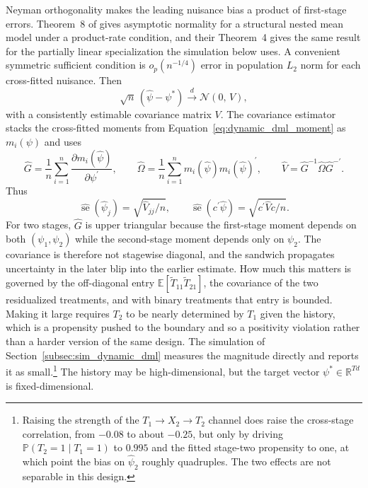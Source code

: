 Neyman orthogonality makes the leading nuisance bias a product of first-stage errors. Theorem~8 of \citet{lewisSyrgkanis2021dynamicDML} gives asymptotic normality for a structural nested mean model under a product-rate condition, and their Theorem~4 gives the same result for the partially linear specialization the simulation below uses. A convenient symmetric sufficient condition is $o_p(n^{-1/4})$ error in population $L_2$ norm for each cross-fitted nuisance. Then
\begin{equation}
\sqrt{n}\,(\hat\psi - \psi^*) \xrightarrow{d} \mathcal{N}(0,\, V),
\label{eq:dynamic_dml_clt}
\end{equation}
with a consistently estimable covariance matrix $V$. The covariance estimator stacks the cross-fitted moments from Equation~\eqref{eq:dynamic_dml_moment} as $m_i(\psi)$ and uses
\begin{equation}
\hat G=\frac1n\sum_{i=1}^n
\frac{\partial m_i(\hat\psi)}{\partial\psi^\prime},
\qquad
\hat\Omega=\frac1n\sum_{i=1}^n
m_i(\hat\psi)m_i(\hat\psi)^\prime,
\qquad
\hat V=\hat G^{-1}\hat\Omega\hat G^{-\prime}.
\label{eq:dynamic_dml_sandwich}
\end{equation}
Thus
\[
\widehat{\operatorname{se}}(\hat\psi_j)
=\sqrt{\hat V_{jj}/n},
\qquad
\widehat{\operatorname{se}}(c^\prime\hat\psi)
=\sqrt{c^\prime\hat Vc/n}.
\]
For two stages, $\hat G$ is upper triangular because the first-stage moment depends on both $(\psi_1,\psi_2)$ while the second-stage moment depends only on $\psi_2$. The covariance is therefore not stagewise diagonal, and the sandwich propagates uncertainty in the later blip into the earlier estimate. How much this matters is governed by the off-diagonal entry $\mathbb E[\tilde T_{11}\tilde T_{21}]$, the covariance of the two residualized treatments, and with binary treatments that entry is bounded. Making it large requires $T_2$ to be nearly determined by $T_1$ given the history, which is a propensity pushed to the boundary and so a positivity violation rather than a harder version of the same design. The simulation of Section~\ref{subsec:sim_dynamic_dml} measures the magnitude directly and reports it as small.\footnote{Raising the strength of the $T_1 \to X_2 \to T_2$ channel does raise the cross-stage correlation, from $-0.08$ to about $-0.25$, but only by driving $\mathbb P(T_2 = 1 \mid T_1 = 1)$ to $0.995$ and the fitted stage-two propensity to one, at which point the bias on $\hat\psi_2$ roughly quadruples. The two effects are not separable in this design.} The history may be high-dimensional, but the target vector $\psi^*\in\mathbb R^{Td}$ is fixed-dimensional.

